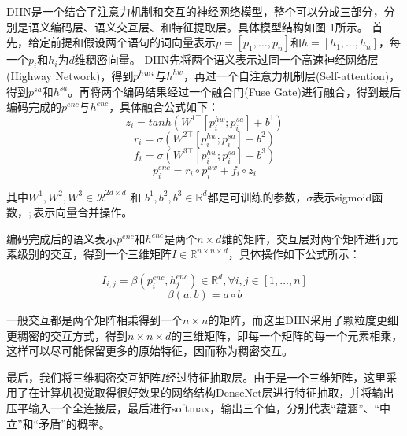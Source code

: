 \documentclass[UTF8,11pt,a4paper,nofonts]{ctexart}
\begin{document}
DIIN是一个结合了注意力机制和交互的神经网络模型，整个可以分成三部分，分别是语义编码层、语义交互层、和特征提取层。具体模型结构如图 1所示。
首先，给定前提和假设两个语句的词向量表示$p=[p_1,\dots,p_n]$和$h=[h_1, \dots, h_n]$，每一个$p_i$和$h_i$为$d$维稠密向量。
DIIN先将两个语义表示过同一个高速神经网络层(Highway Network)，得到$p^{hw}`$与$h^{hw}$，再过一个自注意力机制层(Self-attention)，得到$p^{sa}$和$h^{sa}$。再将两个编码结果经过一个融合门(Fuse Gate)进行融合，得到最后编码完成的$p^{enc}$与$h^{enc}$，具体融合公式如下：
\begin{equation}
z_i = tanh(W^{1\top}[p^{hw}_i;p^{sa}_i]+b^1)
\end{equation}
\begin{equation}
r_i = \sigma(W^{2\top}[p^{hw}_i;p^{sa}_i]+b^2)
\end{equation}
\begin{equation}
f_i = \sigma(W^{3\top}[p^{hw}_i;p^{sa}_i]+b^3)
\end{equation}
\begin{equation}
p^{enc}_i = r_i \circ p^{hw}_i + f_i \circ z_i
\end{equation}

其中$W^1, W^2, W^3 \in \mathcal{R}^{2d\times d}$ 和 $b^1, b^2, b^3 \in \mathbb{R}^d$都是可训练的参数，$\sigma$表示sigmoid函数，$;$表示向量合并操作。

编码完成后的语义表示$p^{enc}$和$h^{enc}$是两个$n\times d$维的矩阵，交互层对两个矩阵进行元素级别的交互，得到一个三维矩阵$I \in \mathbb{R}^{n\times n \times d}$，具体操作如下公式所示：

\begin{equation}
I_{i,j} = \beta(p^{enc}_i, h^{enc}_j) \in \mathbb{R}^d, \forall i, j \in [1,\dots,n]
\end{equation}
\begin{equation}
\beta(a, b) = a \circ b
\end{equation}

一般交互都是两个矩阵相乘得到一个$n\times n$的矩阵，而这里DIIN采用了颗粒度更细更稠密的交互方式，得到$n\times n \times d$的三维矩阵，即每一个矩阵的每一个元素相乘，这样可以尽可能保留更多的原始特征，因而称为稠密交互。

最后，我们将三维稠密交互矩阵$I$经过特征抽取层。由于是一个三维矩阵，这里采用了在计算机视觉取得很好效果的网络结构DenseNet层进行特征抽取，并将输出压平输入一个全连接层，最后进行softmax，输出三个值，分别代表“蕴涵”、“中立”和“矛盾”的概率。

\end{document}
